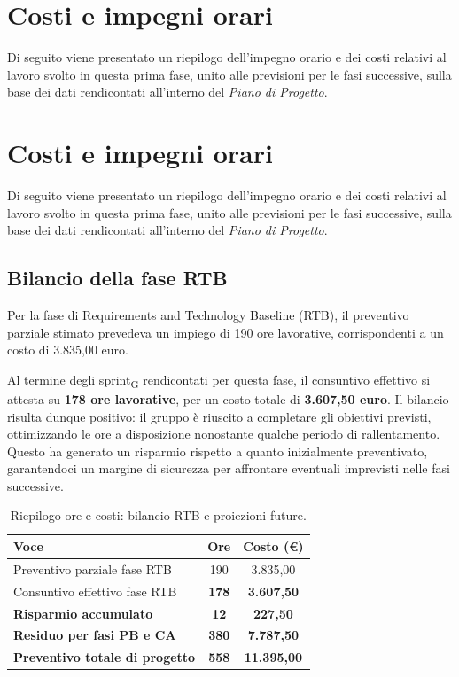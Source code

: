 \documentclass[11pt,a4paper]{article}
\newcommand{\gls}[1]{#1\textsubscript{G}}
\begin{document}
\newpage
\section{Costi e impegni orari}
Di seguito viene presentato un riepilogo dell'impegno orario e dei costi relativi al lavoro svolto in questa prima fase, unito alle previsioni per le fasi successive, sulla base dei dati rendicontati all'interno del \textit{Piano di Progetto}.

\section{Costi e impegni orari}
Di seguito viene presentato un riepilogo dell'impegno orario e dei costi relativi al lavoro svolto in questa prima fase, unito alle previsioni per le fasi successive, sulla base dei dati rendicontati all'interno del \textit{Piano di Progetto}.

\subsection*{Bilancio della fase RTB}
Per la fase di Requirements and Technology Baseline (RTB), il preventivo parziale stimato prevedeva un impiego di 190 ore lavorative, corrispondenti a un costo di 3.835,00 euro. 

Al termine degli \gls{sprint} rendicontati per questa fase, il consuntivo effettivo si attesta su \textbf{178 ore lavorative}, per un costo totale di \textbf{3.607,50 euro}. Il bilancio risulta dunque positivo: il gruppo è riuscito a completare gli obiettivi previsti, ottimizzando le ore a disposizione nonostante qualche periodo di rallentamento. Questo ha generato un risparmio rispetto a quanto inizialmente preventivato, garantendoci un margine di sicurezza per affrontare eventuali imprevisti nelle fasi successive.

\begin{table}[H]
    \centering
    \renewcommand{\arraystretch}{1.3} %
    \begin{tabular}{|l|c|c|}
        \hline
        \textbf{Voce} & \textbf{Ore} & \textbf{Costo (€)} \\
        \hline
        Preventivo parziale fase RTB & 190 & 3.835,00 \\
        Consuntivo effettivo fase RTB & \textbf{178} & \textbf{3.607,50} \\
        \hline
        \textbf{Risparmio accumulato} & \textbf{12} & \textbf{227,50} \\
        \hline\hline
        \textbf{Residuo per fasi PB e CA} & \textbf{380} & \textbf{7.787,50} \\
        \hline
        \textbf{Preventivo totale di progetto} & \textbf{558} & \textbf{11.395,00} \\
        \hline
    \end{tabular}
    \vspace{0.2cm}
    \caption{Riepilogo ore e costi: bilancio RTB e proiezioni future.}
\end{table}
\end{document}
